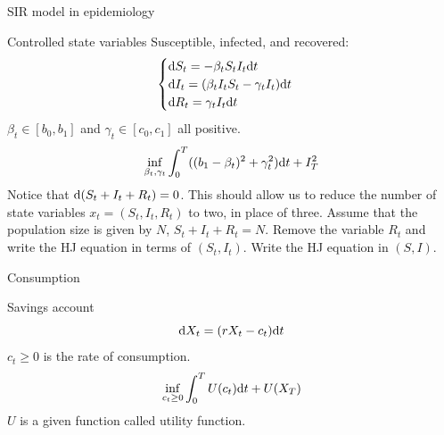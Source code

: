\documentclass[color=usenames,dvipsnames]{beamer}
\newcommand{\dd}{\text{\normalfont d}}
\newcommand{\dt}{\text{\normalfont d}t}
\begin{document}
\begin{frame}{SIR model in epidemiology}
    \begin{block}
        {Controlled state variables}
        Susceptible, infected, and recovered:
        \[
        \begin{cases}
            \dd{S}_t=-\beta_t S_t I_t \dt\\
            \dd{I}_t = (\beta_t I_t S_t - \gamma_t I_t)\dt\\
            \dd{R}_t= \gamma_t I_t \dt
        \end{cases}
        \]
        $\beta_t\in[b_0,b_1]$ and $\gamma_t\in[c_0,c_1]$ all positive.
    \[
    \inf_{\beta_t,\gamma_t}\int_0^T ((b_1-\beta_t)^2+\gamma_t^2)\dt + I^2_T
    \]
    Notice that $\dd(S_t+I_t+R_t)=0$. This should allow us to reduce the number of state variables $x_t=(S_t,I_t,R_t)$ to two, in place of three. Assume that the population size is given by $N$, $S_t+I_t+R_t=N$. Remove the variable $R_t$ and write the HJ equation in terms of $(S_t,I_t)$.
    Write the HJ equation in $(S,I)$.
    \end{block}
\end{frame}


\begin{frame}{Consumption}
    \begin{block}
        {Savings account}
        \[
        \dd{X}_t = (rX_t - c_t)\dt
        \]
        $c_t\ge0$ is the rate of consumption.
        \[
        \inf_{c_t\ge0} \int_0^T U(c_t)\dt + U(X_T)
        \]
        $U$ is a given function called {\color{blue}utility function}.
    \end{block}
\end{frame}

\end{document}
